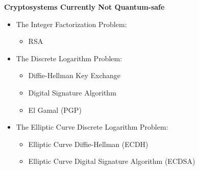 \textbf{Cryptosystems Currently Not Quantum-safe }
\begin{itemize}	
	\item The Integer Factorization Problem: 
	\begin{itemize}	
		\item RSA
	\end{itemize}	
	\item The Discrete Logarithm Problem:
	\begin{itemize}	%
		\item Diffie-Hellman Key Exchange
		\item Digital Signature Algorithm
		\item El Gamal (PGP)
	\end{itemize}	
	\item The Elliptic Curve Discrete Logarithm Problem:
	\begin{itemize}	
		\item Elliptic Curve Diffie-Hellman (ECDH)
		\item Elliptic Curve Digital Signature Algorithm (ECDSA)
	\end{itemize}	
\end{itemize}	
